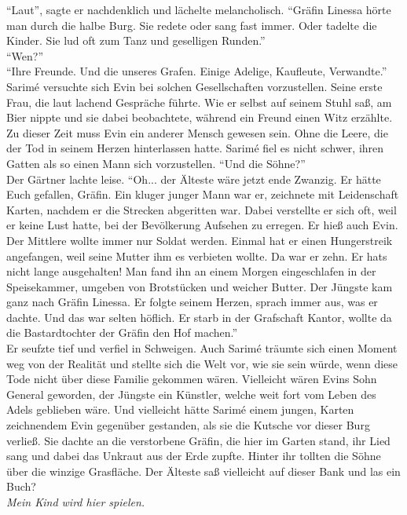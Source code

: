 ``Laut'', sagte er nachdenklich und lächelte melancholisch. ``Gräfin Linessa hörte man durch die 
halbe Burg. Sie redete oder sang fast immer. Oder tadelte die Kinder. Sie lud oft zum Tanz und 
geselligen Runden.''\\
``Wen?''\\
``Ihre Freunde. Und die unseres Grafen. Einige Adelige, Kaufleute, Verwandte.''\\
Sarimé versuchte sich Evin bei solchen Gesellschaften vorzustellen. Seine erste Frau, die laut 
lachend Gespräche führte. Wie er selbst auf seinem Stuhl saß, am Bier nippte und sie dabei 
beobachtete, während ein Freund einen Witz erzählte. Zu dieser Zeit muss Evin ein anderer Mensch 
gewesen sein. Ohne die Leere, die der Tod in seinem Herzen hinterlassen hatte. Sarimé fiel es nicht 
schwer, ihren Gatten als so einen Mann sich vorzustellen. ``Und die Söhne?''\\
Der Gärtner lachte leise. ``Oh... der Älteste wäre jetzt ende Zwanzig. Er hätte Euch gefallen, 
Gräfin. Ein kluger junger Mann war er, zeichnete mit Leidenschaft Karten, nachdem er die Strecken 
abgeritten war. Dabei verstellte er sich oft, weil er keine Lust hatte, bei der Bevölkerung 
Aufsehen zu erregen. Er hieß auch Evin. Der Mittlere wollte immer nur Soldat werden. Einmal hat er 
einen Hungerstreik angefangen, weil seine Mutter ihm es verbieten wollte. Da war er zehn. Er hats 
nicht lange ausgehalten! Man fand ihn an einem Morgen eingeschlafen in der Speisekammer, umgeben 
von Brotstücken und weicher Butter. Der Jüngste kam ganz nach Gräfin Linessa. Er folgte seinem 
Herzen, sprach immer aus, was er dachte. Und das war selten höflich. Er starb in der Grafschaft 
Kantor, wollte da die Bastardtochter der Gräfin den Hof machen.''\\
Er seufzte tief und verfiel in Schweigen. Auch Sarimé träumte sich einen Moment weg von der 
Realität und stellte sich die Welt vor, wie sie sein würde, wenn diese Tode nicht über diese 
Familie gekommen wären. Vielleicht wären Evins Sohn General geworden, der Jüngste ein Künstler, 
welche weit fort vom Leben des Adels geblieben wäre. Und vielleicht hätte Sarimé einem jungen, 
Karten zeichnendem Evin gegenüber gestanden, als sie die Kutsche vor dieser Burg verließ. Sie 
dachte an die verstorbene Gräfin, die hier im Garten stand, ihr Lied sang und dabei das Unkraut aus 
der Erde zupfte. Hinter ihr tollten die Söhne über die winzige Grasfläche. Der Älteste saß 
vielleicht auf dieser Bank und las ein Buch?\\
\textit{Mein Kind wird hier spielen.}\\
